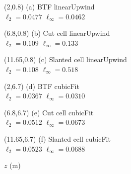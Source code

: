 \documentclass{article}
\begin{document}
\TPMargin{1pt}
\begin{textblock}{4}(2,0.8)
\normalsize
(a) BTF linearUpwind \\
\hspace*{0.3em}$\ell_2 = \num{0.0477}$
\hspace*{1em}$\ell_\infty = \num{0.0462}$
\end{textblock}
\begin{textblock}{4}(6.8,0.8)
\normalsize
(b) Cut cell linearUpwind \\
\hspace*{0.3em}$\ell_2 = \num{0.109}$
\hspace*{1em}$\ell_\infty = \num{0.133}$
\end{textblock}
\begin{textblock}{4}(11.65,0.8)
\normalsize
(c) Slanted cell linearUpwind \\
\hspace*{0.3em}$\ell_2 = \num{0.108}$
\hspace*{1em}$\ell_\infty = \num{0.518}$
\end{textblock}
\begin{textblock}{4}(2,6.7)
\normalsize
(d) BTF cubicFit \\
\hspace*{0.3em}$\ell_2 = \num{0.0367}$
\hspace*{1em}$\ell_\infty = \num{0.0310}$
\end{textblock}
\begin{textblock}{4}(6.8,6.7)
\normalsize
(e) Cut cell cubicFit \\
\hspace*{0.3em}$\ell_2 = \num{0.0512}$
\hspace*{1em}$\ell_\infty = \num{0.0673}$
\end{textblock}
\begin{textblock}{4}(11.65,6.7)
\normalsize
(f) Slanted cell cubicFit \\
\hspace*{0.3em}$\ell_2 = \num{0.0523}$
\hspace*{1em}$\ell_\infty = \num{0.0688}$
\end{textblock}
$z$ (\si{\meter})  \\
\end{document}
